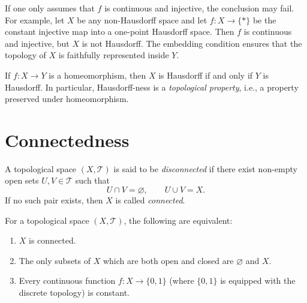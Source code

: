 \begin{remark}
If one only assumes that \(f\) is continuous and injective, the conclusion may fail.  
For example, let \(X\) be any non-Hausdorff space and let \(f : X \to \{*\}\) be the constant injective map into a one-point Hausdorff space. Then \(f\) is continuous and injective, but \(X\) is not Hausdorff. The embedding condition ensures that the topology of \(X\) is faithfully represented inside \(Y\).
\end{remark}

\begin{corollary} \label{cor:Hausdorff_invariant}
If \(f : X \to Y\) is a homeomorphism, then \(X\) is Hausdorff if and only if \(Y\) is Hausdorff.  
In particular, Hausdorff-ness is a \emph{topological property}, i.e., a property preserved under homeomorphism.
\end{corollary}

\section{Connectedness}

\begin{definition} \label{def:connected}
A topological space \((X, \mathcal{T})\) is said to be \emph{disconnected} if there exist non-empty open sets \(U,V \in \mathcal{T}\) such that
\[
U \cap V = \varnothing, \qquad U \cup V = X.
\]
If no such pair exists, then \(X\) is called \emph{connected}.
\end{definition}

\begin{proposition} \label{prop:connected_equiv}
For a topological space \((X, \mathcal{T})\), the following are equivalent:
\begin{enumerate}
    \item \(X\) is connected.
    \item The only subsets of \(X\) which are both open and closed are \(\varnothing\) and \(X\).
    \item Every continuous function \(f : X \to \{0,1\}\) (where \(\{0,1\}\) is equipped with the discrete topology) is constant.
\end{enumerate}
\end{proposition}

